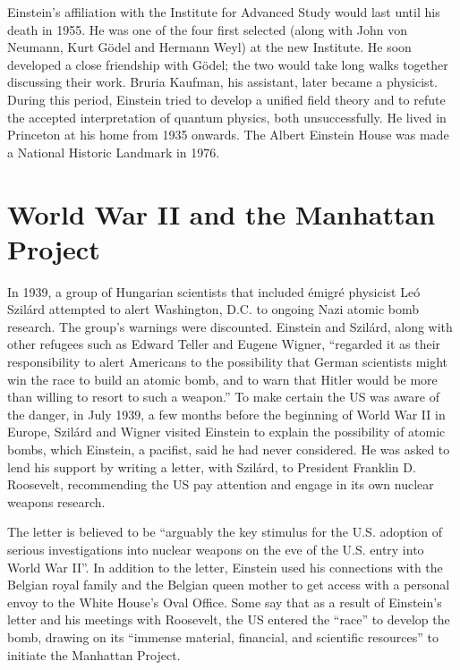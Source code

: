 \documentclass[twoside]{memoir}
\begin{document}
Einstein's affiliation with the Institute for Advanced Study would last until his death in 1955.\cite{mzNc5} He was one of the four first selected (along with John von Neumann, Kurt Gödel and Hermann Weyl) at the new Institute. He soon developed a close friendship with Gödel;  the two would take long walks together discussing their work. Bruria Kaufman, his assistant, later became a physicist. During this period, Einstein tried to develop a unified field theory and to refute the accepted interpretation of quantum physics, both unsuccessfully. He lived in Princeton  at his home from 1935 onwards. The Albert Einstein House was made a National Historic Landmark in 1976. 

\section{World War II and the Manhattan Project}\label{world-war-ii-and-the-manhattan-project}

In 1939, a group of Hungarian scientists that included émigré physicist Leó Szilárd  attempted to alert Washington, D.C. to ongoing Nazi atomic bomb research. The group's warnings were discounted. Einstein and Szilárd, along with other refugees such as Edward Teller and Eugene Wigner, \enquote{regarded it as their responsibility to alert Americans to the possibility that German scientists might win the race to build an atomic bomb, and to warn that Hitler would be more than willing to resort to such a weapon.}\cite{o4fkQ} To make certain the US was aware of the danger, in July 1939, a few months before the beginning of World War II in Europe, Szilárd and Wigner visited Einstein to explain the possibility of atomic bombs,  which Einstein, a pacifist, said he had never considered.\cite{pRqWK} He was asked to lend his support by writing a letter, with Szilárd, to President Franklin D. Roosevelt, recommending the US pay attention and engage in its own nuclear weapons research.

The letter is believed to be \enquote{arguably the key stimulus for the U.S. adoption of serious investigations into nuclear weapons on the eve of the U.S. entry into World War II}.\cite{4Z68g} In addition to the letter, Einstein used his connections with the Belgian royal family\cite{eZym8} and the Belgian queen mother to get access with a personal envoy to the White House's Oval Office. Some say that as a result of Einstein's letter and his meetings with Roosevelt, the US entered the \enquote{race} to develop the bomb, drawing on its \enquote{immense material, financial, and scientific resources} to initiate the Manhattan Project.
\end{document}
